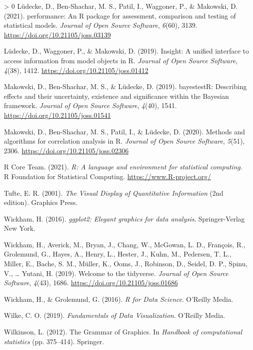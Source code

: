 \documentclass[10pt,a4paper,onecolumn]{article}
\newlength{\cslhangindent}
\newenvironment{CSLReferences}[3] %
 {%
  \setlength{\parindent}{0pt}
  \ifodd #1 \everypar{\setlength{\hangindent}{\cslhangindent}}\ignorespaces\fi
  \ifnum #2 > 0
  \setlength{\parskip}{#2\baselineskip}
  \fi
 }%
 {}
\begin{document}
\begin{CSLReferences}{1}{0}
\leavevmode\hypertarget{ref-Luxfcdecke2020performance}{}%
Lüdecke, D., Ben-Shachar, M. S., Patil, I., Waggoner, P., \& Makowski,
D. (2021). {performance}: An {R} package for assessment, comparison and
testing of statistical models. \emph{Journal of Open Source Software},
\emph{6}(60), 3139. \url{https://doi.org/10.21105/joss.03139}

\leavevmode\hypertarget{ref-Luxfcdecke2019}{}%
Lüdecke, D., Waggoner, P., \& Makowski, D. (2019). Insight: A unified
interface to access information from model objects in {R}. \emph{Journal
of Open Source Software}, \emph{4}(38), 1412.
\url{https://doi.org/10.21105/joss.01412}

\leavevmode\hypertarget{ref-Makowski2019}{}%
Makowski, D., Ben-Shachar, M. S., \& Lüdecke, D. (2019). bayestestR:
Describing effects and their uncertainty, existence and significance
within the {B}ayesian framework. \emph{Journal of Open Source Software},
\emph{4}(40), 1541. \url{https://doi.org/10.21105/joss.01541}

\leavevmode\hypertarget{ref-Makowski2020}{}%
Makowski, D., Ben-Shachar, M. S., Patil, I., \& Lüdecke, D. (2020).
Methods and algorithms for correlation analysis in {R}. \emph{Journal of
Open Source Software}, \emph{5}(51), 2306.
\url{https://doi.org/10.21105/joss.02306}

\leavevmode\hypertarget{ref-base2021}{}%
R Core Team. (2021). \emph{{R}: A language and environment for
statistical computing}. R Foundation for Statistical Computing.
\url{https://www.R-project.org/}

\leavevmode\hypertarget{ref-tufte2001}{}%
Tufte, E. R. (2001). \emph{The {Visual Display} of {Quantitative
Information}} (2nd edition). {Graphics Press}.

\leavevmode\hypertarget{ref-Wickham2016}{}%
Wickham, H. (2016). \emph{{ggplot2}: Elegant graphics for data
analysis}. Springer-Verlag New York.

\leavevmode\hypertarget{ref-Wickham2019}{}%
Wickham, H., Averick, M., Bryan, J., Chang, W., McGowan, L. D.,
François, R., Grolemund, G., Hayes, A., Henry, L., Hester, J., Kuhn, M.,
Pedersen, T. L., Miller, E., Bache, S. M., Müller, K., Ooms, J.,
Robinson, D., Seidel, D. P., Spinu, V., \ldots{} Yutani, H. (2019).
Welcome to the {tidyverse}. \emph{Journal of Open Source Software},
\emph{4}(43), 1686. \url{https://doi.org/10.21105/joss.01686}

\leavevmode\hypertarget{ref-wickham2016r}{}%
Wickham, H., \& Grolemund, G. (2016). \emph{{R for Data Science}}.
O'Reilly Media.

\leavevmode\hypertarget{ref-wilke2019fundamentals}{}%
Wilke, C. O. (2019). \emph{{Fundamentals of Data Visualization}}.
O'Reilly Media.

\leavevmode\hypertarget{ref-Wilkinson2012}{}%
Wilkinson, L. (2012). {The Grammar of Graphics}. In \emph{Handbook of
computational statistics} (pp. 375--414). Springer.

\end{CSLReferences}
\end{document}
